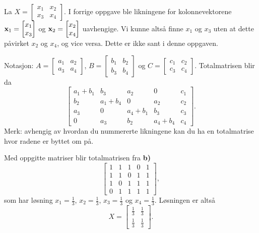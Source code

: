 \begin{losning}

\begin{punkt}
La $X=\begin{bmatrix}
x_1 & x_2\\
x_3 & x_4
\end{bmatrix}.$ I forrige oppgave ble likningene for kolonnevektorene $\mathbf{x}_1=\begin{bmatrix}
x_1\\
x_3
\end{bmatrix}$ og $\mathbf{x}_2=\begin{bmatrix}
x_2\\
x_4
\end{bmatrix}$ uavhengige. Vi kunne altså finne $x_1$ og $x_3$ uten at dette påvirket $x_2$ og $x_4$, og vice versa. Dette er ikke sant i denne oppgaven.
\end{punkt}

\begin{punkt}
Notasjon: $A=\begin{bmatrix}
a_1 & a_2\\
a_3 & a_4
\end{bmatrix}$, $B=\begin{bmatrix}
b_1 & b_2\\
b_3 & b_4
\end{bmatrix}$ og $C=\begin{bmatrix}
c_1 & c_2\\
c_3 & c_4
\end{bmatrix}$. Totalmatrisen blir da $$\begin{bmatrix}
a_1+b_1 & b_3 & a_2 & 0 & c_1\\
b_2 & a_1+b_4 & 0 & a_2 & c_2\\
a_3 & 0 & a_4+b_1 & b_3 & c_3\\
0 & a_3 & b_2 & a_4+b_4 & c_4
\end{bmatrix}.$$ Merk: avhengig av hvordan du nummererte likningene kan du ha en totalmatrise hvor radene er byttet om på.
\end{punkt}


\begin{punkt}
Med oppgitte matriser blir totalmatrisen fra \textbf{b)}$$\begin{bmatrix}
1 & 1 & 1 & 0 & 1\\
1 & 1 & 0 & 1 & 1\\
1 & 0 & 1 & 1 & 1\\
0 & 1 & 1 & 1 & 1
\end{bmatrix},$$ som har løsning $x_1=\frac{1}{3}$, $x_2=\frac{1}{3}$, $x_3=\frac{1}{3}$ og $x_4=\frac{1}{3}$. Løsningen er altså   
$$X=\begin{bmatrix}
\frac{1}{3} & \frac{1}{3}\\
\frac{1}{3} & \frac{1}{3}
\end{bmatrix}.$$
\end{punkt}

\end{losning}


